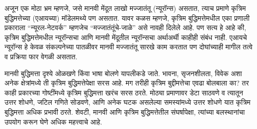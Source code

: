 अजून एक मोठा भ्रम म्हणजे, जसे मानवी मेंदूत लाखो मज्जातंतू (न्यूरॉन्स) असतात, त्याच प्रमाणे कृत्रिम बुद्धिमत्तेच्या (एआयच्या) मॉडेलमथ्ये पण असतात. यावर कळस म्हणजे, कृत्रिम बुद्धिमत्तेमधील एका प्रणाली प्रकाराला ``न्यूरल-नेटवर्क'' म्हणजेच ``मज्जातंतूंचे-जाळे'' असे नावही दिलेले आहे. पण सत्य हे आहे की,  कृत्रिम बुद्धिमत्तेमधील न्यूरॉन्सचा आणि मानवी मेंदूतील न्यूरॉन्सचा अर्थाअर्थी काहीही संबंध नाही. एआयचे न्यूरॉन्स हे केवळ संकल्पनेच्या पातळीवर मानवी मज्जातंतू सारखे काम करतात पण दोघांच्याही मागील तत्वे व प्रक्रिया फार वेगळी असतात. 

मानवी बुद्धिमत्ता दृश्ये ओळखणे किंवा भाषा बोलणे यापलीकडे जाते. भावना, सृजनशीलता, विवेक अशा अनेक क्षेत्रांमध्ये ती कृत्रिम बुद्धिमत्तेपेक्षा सरस आहे. मग तरीही कृत्रिम बुद्दीमत्तेचा एवढा बोलबाला का? तर काही प्रकारच्या गोष्टींमध्ये कृत्रिम बुद्धिमत्ता खरंच सरस ठरते. मोठ्या प्रमाणावर डेटा साठवणे व त्यातून उत्तर शोधणे, जटिल गणिते सोडवणे, आणि अनेक घटक असलेल्या समस्यांमध्ये उत्तर शोधणे यात कृत्रिम बुद्धिमत्ता अधिक प्रभावी ठरते. शेवटी, मानवी आणि कृत्रिम बुद्धिमत्तेतील संघर्षापेक्षा, त्यांच्या बलस्थानांचा उपयोग करून घेणे अधिक महत्त्वाचे आहे.



